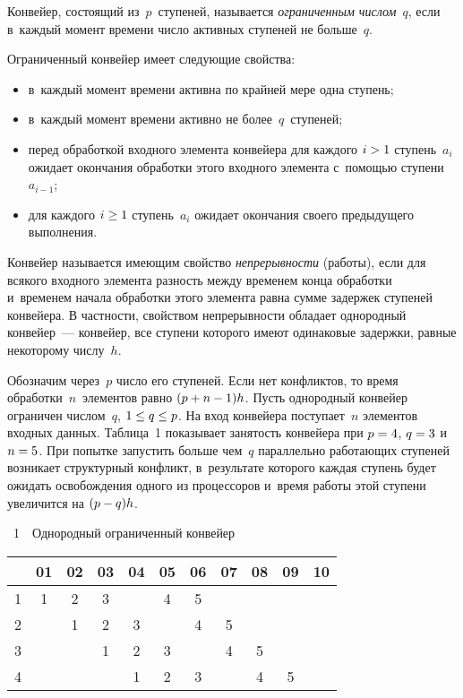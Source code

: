 \begin{multicols}{2}
  Конвейер, состоящий из~$p$~ступеней, называется \textit{ограниченным 
числом}~$q$, если в~каждый момент времени число активных ступеней не 
больше~$q$. 
  
  Ограниченный конвейер имеет следующие свойства:
  \begin{itemize}
\item в~каждый момент времени активна по крайней мере одна ступень;
\item в~каждый момент времени активно не более~$q$~ступеней;
\item перед обработкой входного элемента конвейера для каждого 
$i\hm>1$ ступень~$a_i$ ожидает окончания обработки этого входного 
элемента с~помощью ступени~$a_{i-1}$; 
\item для каждого $i\hm\geq 1$ ступень~$a_i$ ожидает окончания своего 
предыдущего выполнения.
\end{itemize}

  Конвейер называется имеющим свойство \textit{непрерывности} 
(работы), если для всякого входного элемента разность между временем 
конца обработки и~временем начала обработки этого элемента равна сумме 
задержек ступеней конвейера. 
  В част\-ности, свойством непрерывности обладает однородный  
конвейер~--- конвейер, все ступени которого имеют одинаковые задержки, 
равные некоторому числу~$h$.

 Обозначим через~$p$ число его ступеней. 
Если нет конфликтов, то время обработки~$n$~элементов равно 
$(p\hm+n\hm-1)h$. Пусть однородный конвейер ограничен числом~$q$, 
$1\hm\leq q\hm\leq p$. На вход конвейера поступает~$n$ элементов входных 
данных. Таблица~1 показывает занятость конвейера при $p\hm=4$, 
$q\hm=3$ и~$n\hm=5$. При попытке запустить больше чем~$q$ параллельно 
работающих ступеней возникает структурный конфликт, в~результате 
которого каж\-дая ступень будет ожидать освобождения одного из 
процессоров и~время работы этой ступени увеличится на $(p\hm-q)h$. 

\begin{center}
\vspace*{3pt}
{{\tablename~1}\ \ \small{Однородный ограниченный конвейер }}

\vspace*{9pt}


{\small
\tabcolsep=5.8pt
\begin{tabular}{|c|c|c|c|c|c|c|c|c|c|c|}
\hline
&01&02&03&04&05&06&07&08&09&10\\
\hline
1&1&2&3&&4&5&&&&\\
2&&1&2&3&&4&5&&&\\
3&&&1&2&3&&4&5&&\\
4&&&&1&2&3&&4&5&\\
\hline
\end{tabular}
}
\end{center}


\end{multicols}
